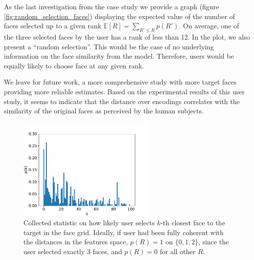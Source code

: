As the last investigation from the case study we provide a graph (figure \ref{fig:random_selection_faces}) displaying the expected value of the number of faces selected up to a given rank $\mathbb{E}[R] = \sum_{R' \leq R}p(R')$. On average, one of the three selected faces by the user has a rank of less than 12. In the plot, we also present a ``random selection''. This would be the case of no underlying information on the face similarity from the model. Therefore, users would be equally likely to choose face at any given rank.

We leave for future work, a more comprehensive study with more target faces providing more reliable estimates. Based on the experimental results of this user study, it seems to indicate that the distance over encodings correlates with the similarity of the original faces as perceived by the human subjects.

\begin{figure}
    \centering
    \includegraphics[width=0.6\textwidth]{graphs/survey_distribution_without_the_easy.pdf}
    
    \caption{Collected statistic on how likely user selects $k$-th closest face to the target in the face grid. Ideally, if user had been fully coherent with the distances in the features space, $p(R) = 1$ on $\{0,1,2\}$, since the user selected exactly 3 faces, and $p(R) = 0$ for all other $R$.}
    \label{fig:survey_distribution}
\end{figure}


